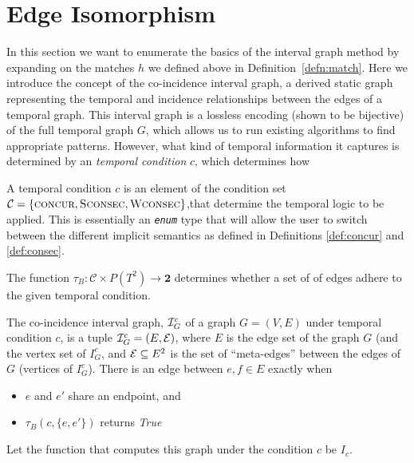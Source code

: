 \section{Edge Isomorphism}

In this section we want to enumerate the basics of the interval graph method by
expanding on the matches $h$ we defined above in
Definition~\ref{defn:match}. Here we introduce the concept of the co-incidence
interval graph, a derived static graph representing the temporal and incidence
relationships between the edges of a temporal graph. This interval graph is a
lossless encoding (shown to be bijective) of the full temporal graph $G$, which
allows us to run existing algorithms to find appropriate patterns. However, what
kind of temporal information it captures is determined by an \textit{temporal
  condition} $c$, which determines how 

\begin{defn}
  A temporal condition $c$ is an element of the condition set $\mathcal{C} =
  \{\textsc{concur}, \textsc{Sconsec}, \textsc{Wconsec}\}$,that determine the
  temporal logic to be applied. This is essentially an \emph{\texttt{enum}} type that
  will allow the user to switch between the different implicit semantics as
  defined in Definitions \ref{def:concur} and \ref{def:consec}.
\end{defn}

\begin{defn}
  The function $\tau_B : \mathcal{C} \times P(T^2) \to \textbf{2}$ determines
  whether a set of of edges adhere to the given temporal condition.
\end{defn}

\begin{defn}
  \label{def:ci_graph}
  The co-incidence interval graph, $\mathcal{I}_G^c$ of a graph $G = (V,E)$ under
  temporal condition $c$, is a tuple $\mathcal{I}_G^c = (E, \mathcal{E})$, where $E$ is the edge
  set of the graph $G$ (and the vertex set of $I_G^c$, and $\mathcal{E} \subseteq E^2$ is
  the set of ``meta-edges'' between the edges of $G$ (vertices of
  $I_G^c$). There is an edge between $e,f \in E$ exactly when
  \begin{itemize}
    \item $e$ and $e'$ share an endpoint, and
    \item $\tau_B(c,\{e,e'\})$ returns \emph{True}
  \end{itemize}

  Let the function that computes this graph under the condition $c$ be $I_c$.
\end{defn}

